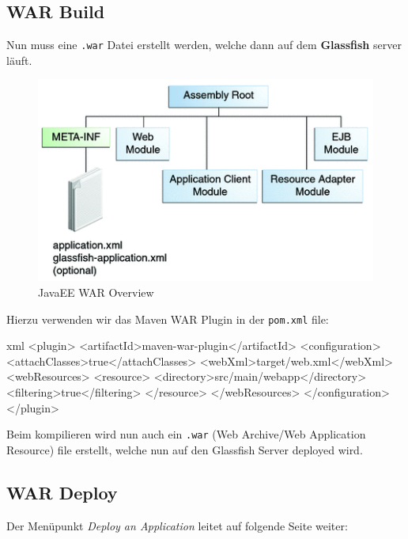 \subsection{WAR Build}
Nun muss eine \texttt{.war} Datei erstellt werden, welche dann auf dem \textbf{Glassfish} server läuft.

\begin{figure}
    \centering
    \includegraphics[width=\textwidth]{images/war-overview}
    \caption{JavaEE WAR Overview \cite{javaee:war}}
\end{figure}


Hierzu verwenden wir das Maven WAR Plugin in der \texttt{pom.xml} file:

\begin{code}{xml}
    <plugin>
        <artifactId>maven-war-plugin</artifactId>
        <configuration>
            <attachClasses>true</attachClasses>
            <webXml>target/web.xml</webXml>
            <webResources>
                <resource>
                    <directory>src/main/webapp</directory>
                    <filtering>true</filtering>
                </resource>
            </webResources>
        </configuration>
    </plugin>
\end{code}

Beim kompilieren wird nun auch ein \texttt{.war} (Web Archive/Web Application Resource) file erstellt, welche nun auf den Glassfish Server deployed wird.

\subsection{WAR Deploy}

Der Menüpunkt \textit{Deploy an Application} leitet auf folgende Seite weiter:

